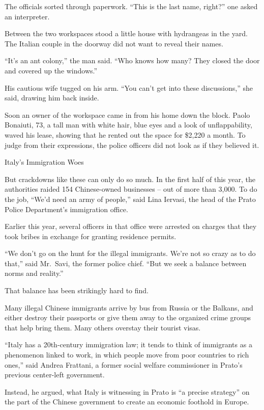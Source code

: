 ﻿\documentclass[12pt]{article}
\begin{document}
The officials sorted through paperwork. ``This is the last name, right?'' one asked an interpreter.

Between the two workspaces stood a little house with hydrangeas in the yard. The Italian couple in
the doorway did not want to reveal their names.

``It's an ant colony,'' the man said. ``Who knows how many? They closed the door and covered up the
windows.''

His cautious wife tugged on his arm. ``You can't get into these discussions,'' she said, drawing him
back inside.

Soon an owner of the workspace came in from his home down the block. Paolo Bonaiuti, 73, a tall man
with white hair, blue eyes and a look of unflappability, waved his lease, showing that he rented out
the space for \$2,220 a month. To judge from their expressions, the police officers did not look as
if they believed it.

\textsf{Italy's Immigration Woes}

But crackdowns like these can only do so much. In the first half of this year, the authorities
raided 154 Chinese-owned businesses -- out of more than 3,000. To do the job, ``We'd need an army of
people,'' said Lina Iervasi, the head of the Prato Police Department's immigration office.

Earlier this year, several officers in that office were arrested on charges that they took bribes in
exchange for granting residence permits.

``We don't go on the hunt for the illegal immigrants. We're not so crazy as to do that,'' said
Mr.~Savi, the former police chief. ``But we seek a balance between norms and reality.''

That balance has been strikingly hard to find.

Many illegal Chinese immigrants arrive by bus from Russia or the Balkans, and either destroy their
passports or give them away to the organized crime groups that help bring them. Many others overstay
their tourist visas.

``Italy has a 20th-century immigration law; it tends to think of immigrants as a phenomenon linked
to work, in which people move from poor countries to rich ones,'' said Andrea Frattani, a former
social welfare commissioner in Prato's previous center-left government.

Instead, he argued, what Italy is witnessing in Prato is ``a precise strategy'' on the part of the
Chinese government to create an economic foothold in Europe.
\end{document}
